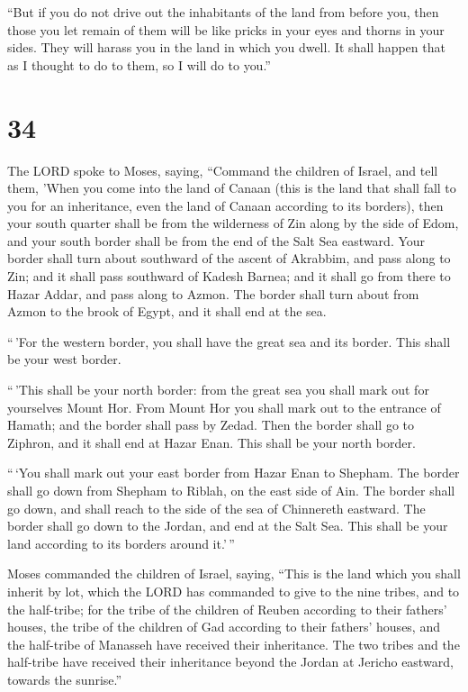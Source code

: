  ``But if you do not drive out the inhabitants of the
land from before you, then those you let remain of them will be like
pricks in your eyes and thorns in your sides. They will harass you in
the land in which you dwell.  It shall happen that as I
thought to do to them, so I will do to you.''

\hypertarget{section-33}{%
\section{34}\label{section-33}}

 The LORD spoke to Moses, saying,  ``Command
the children of Israel, and tell them, 'When you come into the land of
Canaan (this is the land that shall fall to you for an inheritance, even
the land of Canaan according to its borders),  then your
south quarter shall be from the wilderness of Zin along by the side of
Edom, and your south border shall be from the end of the Salt Sea
eastward.  Your border shall turn about southward of the
ascent of Akrabbim, and pass along to Zin; and it shall pass southward
of Kadesh Barnea; and it shall go from there to Hazar Addar, and pass
along to Azmon.  The border shall turn about from Azmon to
the brook of Egypt, and it shall end at the sea.

 ``\,'For the western border, you shall have the great sea
and its border. This shall be your west border.

 ``\,'This shall be your north border: from the great sea
you shall mark out for yourselves Mount Hor.  From Mount
Hor you shall mark out to the entrance of Hamath; and the border shall
pass by Zedad.  Then the border shall go to Ziphron, and
it shall end at Hazar Enan. This shall be your north border.

 ``\,`You shall mark out your east border from Hazar Enan
to Shepham.  The border shall go down from Shepham to
Riblah, on the east side of Ain. The border shall go down, and shall
reach to the side of the sea of Chinnereth eastward.  The
border shall go down to the Jordan, and end at the Salt Sea. This shall
be your land according to its borders around it.'\,''

 Moses commanded the children of Israel, saying, ``This
is the land which you shall inherit by lot, which the LORD has commanded
to give to the nine tribes, and to the half-tribe;  for
the tribe of the children of Reuben according to their fathers' houses,
the tribe of the children of Gad according to their fathers' houses, and
the half-tribe of Manasseh have received their inheritance.
 The two tribes and the half-tribe have received their
inheritance beyond the Jordan at Jericho eastward, towards the
sunrise.''

